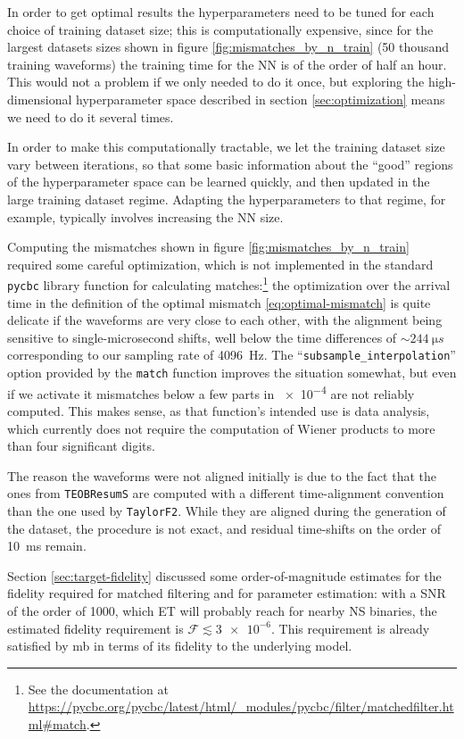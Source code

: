 \documentclass[main.tex]{subfiles}
\begin{document}
In order to get optimal results the hyperparameters need to be tuned for each choice of training dataset size; this is computationally expensive, since for the largest datasets sizes shown in figure \ref{fig:mismatches_by_n_train} (50 thousand training waveforms) the training time for the \ac{NN} is of the order of half an hour. 
This would not a problem if we only needed to do it once, but exploring the high-dimensional hyperparameter space described in section \ref{sec:optimization} means we need to do it several times. 

In order to make this computationally tractable, we let the training dataset size vary between iterations, so that some basic information about the ``good'' regions of the hyperparameter space can be learned quickly, and then updated in the large training dataset regime. 
Adapting the hyperparameters to that regime, for example, typically involves increasing the \ac{NN} size. 

Computing the mismatches shown in figure \ref{fig:mismatches_by_n_train} required some careful optimization, which is not implemented in the standard \texttt{pycbc} \cite[]{nitzGwastroPycbc2021} library function for calculating matches:\footnote{See the documentation at \url{https://pycbc.org/pycbc/latest/html/\_modules/pycbc/filter/matchedfilter.html\#match}.} the optimization over the arrival time in the definition of the optimal mismatch \eqref{eq:optimal-mismatch} is quite delicate if the waveforms are very close to each other, with the alignment being sensitive to single-microsecond shifts, well below the time differences of \(\sim \SI{244}{\micro s}\) corresponding to our sampling rate of \SI{4096}{Hz}. 
The ``\texttt{subsample\_interpolation}'' option provided by the \texttt{match} function improves the situation somewhat, but even if we activate it mismatches below a few parts in \num{e-4} are not reliably computed. 
This makes sense, as that function's intended use is data analysis, which currently does not require the computation of Wiener products to more than four significant digits.

The reason the waveforms were not aligned initially is due to the fact that the ones from \texttt{TEOBResumS} are computed with a different time-alignment convention than the one used by \texttt{TaylorF2}. 
While they are aligned during the generation of the dataset, the procedure is not exact, and residual time-shifts on the order of \SI{10}{ms} remain.

Section \ref{sec:target-fidelity} discussed some order-of-magnitude estimates for the fidelity required for matched filtering and for parameter estimation: with a \ac{SNR} of the order of 1000, which \ac{ET} will probably reach for nearby \ac{NS} binaries, the estimated fidelity requirement is \(\mathcal{F} \lesssim \num{3e-6}\). 
This requirement is already satisfied by \ac{mb} in terms of its fidelity to the underlying model. 
\end{document}
